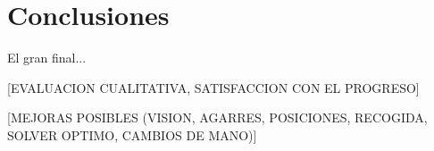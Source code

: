 \chapter{Conclusiones}

El gran final...

[EVALUACION CUALITATIVA, SATISFACCION CON EL PROGRESO]

[MEJORAS POSIBLES (VISION, AGARRES, POSICIONES, RECOGIDA, SOLVER OPTIMO, CAMBIOS DE MANO)]
